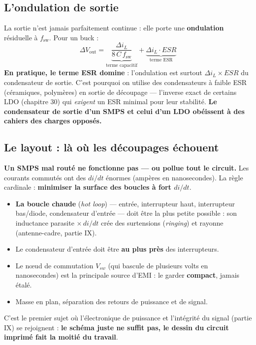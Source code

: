 \documentclass[12pt,a4paper,twoside]{book}
\begin{document}
\subsection{L'ondulation de sortie}

\begin{formule}
La sortie n'est jamais parfaitement continue : elle porte une \textbf{ondulation} résiduelle à $f_{\text{sw}}$. Pour un buck :
\[
\Delta V_{\text{out}} = \underbrace{\frac{\Delta i_L}{8\,C\,f_{\text{sw}}}}_{\text{terme capacitif}} + \underbrace{\Delta i_L \cdot ESR}_{\text{terme ESR}}
\]
\textbf{En pratique, le terme ESR domine} : l'ondulation est surtout $\Delta i_L \times ESR$ du condensateur de sortie. C'est pourquoi on utilise des condensateurs à faible ESR (céramiques, polymères) en sortie de découpage --- l'inverse exact de certains LDO (chapitre 30) qui \textit{exigent} un ESR minimal pour leur stabilité. \textbf{Le condensateur de sortie d'un SMPS et celui d'un LDO obéissent à des cahiers des charges opposés.}
\end{formule}

\subsection{Le layout : là où les découpages échouent}

\begin{attention}
\textbf{Un SMPS mal routé ne fonctionne pas --- ou pollue tout le circuit.} Les courants commutés ont des $di/dt$ énormes (ampères en nanosecondes). La règle cardinale : \textbf{minimiser la surface des boucles à fort $di/dt$}.

\begin{itemize}[nosep]
\item \textbf{La boucle chaude} (\textit{hot loop}) --- entrée, interrupteur haut, interrupteur bas/diode, condensateur d'entrée --- doit être la plus petite possible : son inductance parasite $\times\,di/dt$ crée des surtensions (\textit{ringing}) et rayonne (antenne-cadre, partie IX).
\item Le condensateur d'entrée doit être \textbf{au plus près} des interrupteurs.
\item Le nœud de commutation $V_{sw}$ (qui bascule de plusieurs volts en nanosecondes) est la principale source d'EMI : le garder \textbf{compact}, jamais étalé.
\item Masse en plan, séparation des retours de puissance et de signal.
\end{itemize}
C'est le premier sujet où l'électronique de puissance et l'intégrité du signal (partie IX) se rejoignent : \textbf{le schéma juste ne suffit pas, le dessin du circuit imprimé fait la moitié du travail}.
\end{attention}
\end{document}
